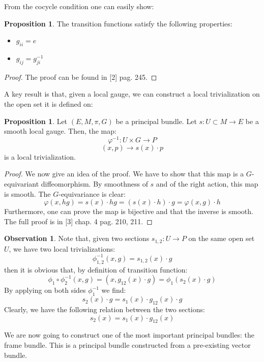 \documentclass[12pt,a4paper]{report}
\theoremstyle{definition}
\theoremstyle{Theorem}
\newtheorem{Prop}[Def]{Proposition}
\theoremstyle{definition}
\theoremstyle{definition}
\newtheorem{Obs}[Def]{Observation}
\begin{document}
	From the cocycle condition one can easily show:
	\begin{Prop}
		The transition functions satisfy the following properties:
		\begin{itemize}
			\item $g_{ii}=e$
			\item $g_{ij}=g_{ji}^{-1}$
		\end{itemize}
	\end{Prop}
	\begin{proof}
		The proof can be found in [2] pag. 245.
	\end{proof}
	A key result is that, given a local gauge, we can construct a local trivialization on the open set it is defined on:
	\begin{Prop}\label{Prop_3.5.3}
		Let $(E,M,\pi,G)$ be a principal bundle. Let $s:U\subset M\rightarrow E$ be a smooth local gauge. Then, the map:
		$$\varphi^{-1}: U\times G\rightarrow P$$
		$$(x,p)\rightarrow s(x)\cdot p$$
		is a local trivialization.
	\end{Prop}
	\begin{proof}
		We now give an idea of the proof.
		We have to show that this map is a $G$-equivariant diffeomorphism. By smoothness of $s$ and of the right action, this map is smooth. The $G$-equivariance is clear:
		$$\varphi(x,hg)=s(x)\cdot hg=(s(x)\cdot h)\cdot g=\varphi(x,g)\cdot h$$
		Furthermore, one can prove the map is bijective and that the inverse is smooth. The full proof is in [3] chap. 4 pag. 210, 211.
	\end{proof}
	\begin{Obs}\label{Obs_3.5.3}
		Note that, given two sections $s_{1,2}:U\rightarrow P$ on the same open set $U$, we have two local trivializations:
		$$\phi^{-1}_{1,2}(x,g)=s_{1,2}(x)\cdot g$$
		then it is obvious that, by definition of transition function: 
		$$\phi_1\circ\phi_2^{-1}(x,g)=(x,g_{12}(x)\cdot g)=\phi_1(s_{2}(x)\cdot g)$$
		By applying on both sides $\phi_1^{-1}$ we find:
		$$s_2(x)\cdot g=s_1(x)\cdot g_{12}(x)\cdot g$$
		Clearly, we have the following relation between the two sections:
		$$s_2(x)=s_1(x)\cdot g_{12}(x)$$
	\end{Obs}
	We are now going to construct one of the most important principal bundles: the frame bundle. This is a principal bundle constructed from a pre-existing vector bundle.
\end{document}
